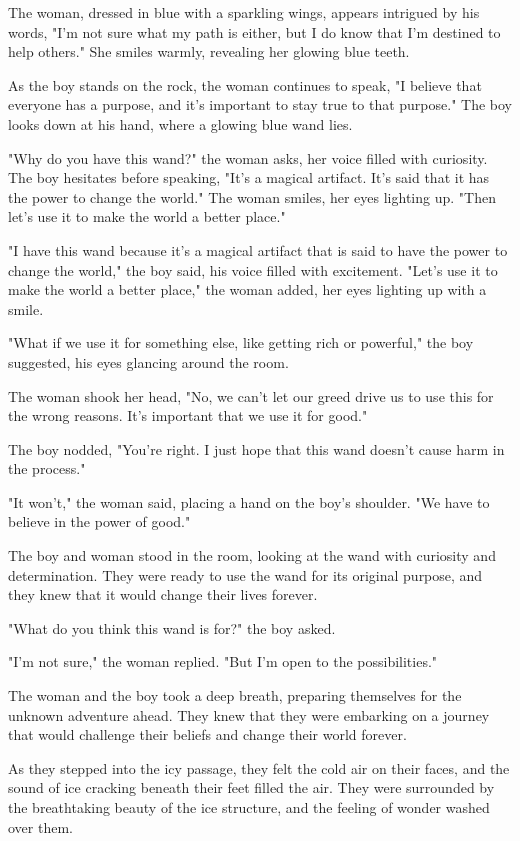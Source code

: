 \documentclass[smalldemyvopaper,11pt,twoside,onecolumn,openright,extrafontsizes]{memoir}
\begin{document}
The woman, dressed in blue with a sparkling wings, appears intrigued by his words, "I'm not sure what my path is either, but I do know that I'm destined to help others." She smiles warmly, revealing her glowing blue teeth.\par
As the boy stands on the rock, the woman continues to speak, "I believe that everyone has a purpose, and it's important to stay true to that purpose." The boy looks down at his hand, where a glowing blue wand lies.\par
"Why do you have this wand?" the woman asks, her voice filled with curiosity. The boy hesitates before speaking, "It's a magical artifact. It's said that it has the power to change the world." The woman smiles, her eyes lighting up. "Then let's use it to make the world a better place."\par
"I have this wand because it's a magical artifact that is said to have the power to change the world," the boy said, his voice filled with excitement. "Let's use it to make the world a better place," the woman added, her eyes lighting up with a smile.\par
"What if we use it for something else, like getting rich or powerful," the boy suggested, his eyes glancing around the room.\par
The woman shook her head, "No, we can't let our greed drive us to use this for the wrong reasons. It's important that we use it for good."\par
The boy nodded, "You're right. I just hope that this wand doesn't cause harm in the process."\par
"It won't," the woman said, placing a hand on the boy's shoulder. "We have to believe in the power of good."\par
The boy and woman stood in the room, looking at the wand with curiosity and determination. They were ready to use the wand for its original purpose, and they knew that it would change their lives forever.\par
"What do you think this wand is for?" the boy asked.\par
"I'm not sure," the woman replied. "But I'm open to the possibilities."\par
The woman and the boy took a deep breath, preparing themselves for the unknown adventure ahead. They knew that they were embarking on a journey that would challenge their beliefs and change their world forever.\par
As they stepped into the icy passage, they felt the cold air on their faces, and the sound of ice cracking beneath their feet filled the air. They were surrounded by the breathtaking beauty of the ice structure, and the feeling of wonder washed over them.\par
\end{document}
